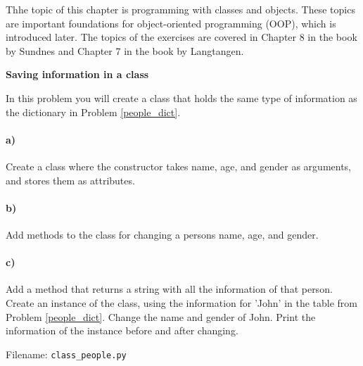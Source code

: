 Thhe topic of this chapter is programming with classes and objects. These topics
are important foundations for object-oriented programming (OOP), which is introduced later.
The topics of the exercises are covered in Chapter 8 in the book by Sundnes and
Chapter 7 in the book by Langtangen.


\begin{Problem}{\textbf{Saving information in a class}} \label{prob71}

\noindent In this problem you will create a class that holds the same type of
information as the dictionary in Problem \ref{people_dict}.

\paragraph{a)}
Create a class  where the constructor takes name, age, and gender as arguments, and stores
them as attributes.

\paragraph{b)}
Add methods to the class for changing a persons name, age, and gender.

\paragraph{c)}
Add a method  that returns a string with all the information of that person. Create an instance of the class, using the
information for 'John' in the table from Problem \ref{people_dict}.
Change the name and gender of John. Print the information of the instance before and after changing.

Filename: \texttt{class\_people.py}
\end{Problem}


